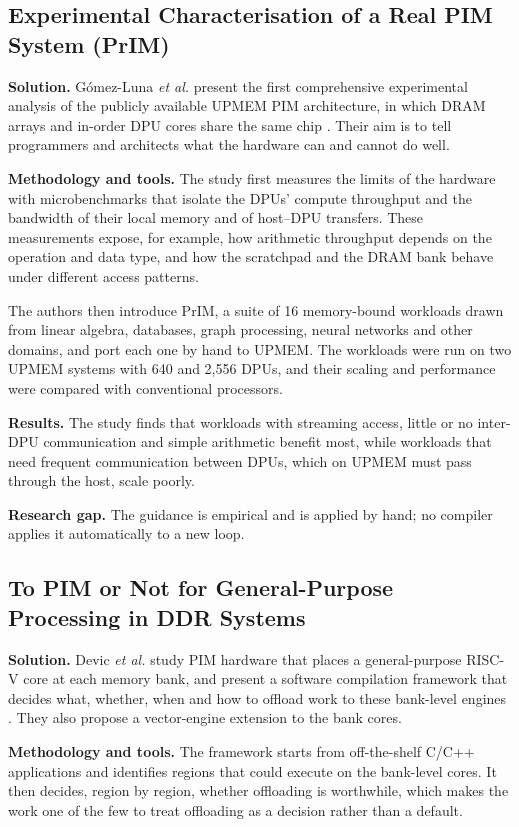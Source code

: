 \documentclass{ieeeaccess}
\begin{document}
\subsection{Experimental Characterisation of a Real PIM System (PrIM)}
\textbf{Solution.} G\'omez-Luna \emph{et al.} present the first comprehensive experimental analysis of the publicly available UPMEM PIM architecture, in which DRAM arrays and in-order DPU cores share the same chip \cite{gomezluna2022prim}. Their aim is to tell programmers and architects what the hardware can and cannot do well.

\textbf{Methodology and tools.} The study first measures the limits of the hardware with microbenchmarks that isolate the DPUs' compute throughput and the bandwidth of their local memory and of host--DPU transfers. These measurements expose, for example, how arithmetic throughput depends on the operation and data type, and how the scratchpad and the DRAM bank behave under different access patterns.

The authors then introduce PrIM, a suite of 16 memory-bound workloads drawn from linear algebra, databases, graph processing, neural networks and other domains, and port each one by hand to UPMEM. The workloads were run on two UPMEM systems with 640 and 2,556 DPUs, and their scaling and performance were compared with conventional processors.

\textbf{Results.} The study finds that workloads with streaming access, little or no inter-DPU communication and simple arithmetic benefit most, while workloads that need frequent communication between DPUs, which on UPMEM must pass through the host, scale poorly.

\textbf{Research gap.} The guidance is empirical and is applied by hand; no compiler applies it automatically to a new loop.

\subsection{To PIM or Not for General-Purpose Processing in DDR Systems}
\textbf{Solution.} Devic \emph{et al.} study PIM hardware that places a general-purpose RISC-V core at each memory bank, and present a software compilation framework that decides what, whether, when and how to offload work to these bank-level engines \cite{devic2022topim}. They also propose a vector-engine extension to the bank cores.

\textbf{Methodology and tools.} The framework starts from off-the-shelf C/C++ applications and identifies regions that could execute on the bank-level cores. It then decides, region by region, whether offloading is worthwhile, which makes the work one of the few to treat offloading as a decision rather than a default.
\end{document}
